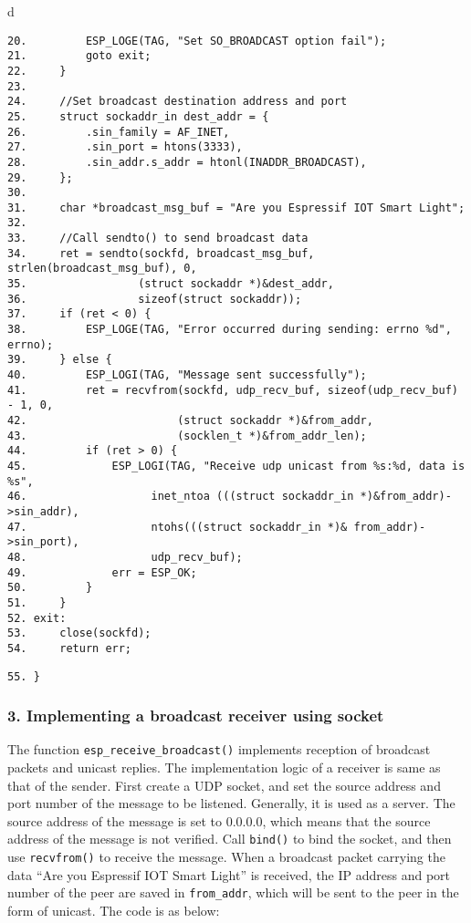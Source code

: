 \documentclass[a4paper,12pt]{book}
\begin{document}
\begin{codebloc}
\begin{tabular}{d}
\vspace{2pt}
\begin{verbatim}
20.         ESP_LOGE(TAG, "Set SO_BROADCAST option fail");
21.         goto exit;
22.     }
23. 	
24.     //Set broadcast destination address and port
25.     struct sockaddr_in dest_addr = {
26.         .sin_family = AF_INET,
27.         .sin_port = htons(3333),
28.         .sin_addr.s_addr = htonl(INADDR_BROADCAST),
29.     };
30.	
31.     char *broadcast_msg_buf = "Are you Espressif IOT Smart Light";
32.	
33.     //Call sendto() to send broadcast data
34.     ret = sendto(sockfd, broadcast_msg_buf, strlen(broadcast_msg_buf), 0,
35.                 (struct sockaddr *)&dest_addr,
36.                 sizeof(struct sockaddr));
37.     if (ret < 0) {
38.         ESP_LOGE(TAG, "Error occurred during sending: errno %d", errno);
39.     } else {
40.         ESP_LOGI(TAG, "Message sent successfully");
41.         ret = recvfrom(sockfd, udp_recv_buf, sizeof(udp_recv_buf) - 1, 0,
42.                       (struct sockaddr *)&from_addr,
43.                       (socklen_t *)&from_addr_len);
44.         if (ret > 0) {
45.             ESP_LOGI(TAG, "Receive udp unicast from %s:%d, data is %s",
46.                   inet_ntoa (((struct sockaddr_in *)&from_addr)->sin_addr),
47.                   ntohs(((struct sockaddr_in *)& from_addr)->sin_port),
48.                   udp_recv_buf);
49.             err = ESP_OK;
50.         }
51.     }
52. exit:
53.     close(sockfd);
54.     return err;
\end{verbatim}
\verb|55. }|
\end{tabular}
\end{codebloc}

\subsubsection{3. Implementing a broadcast receiver using socket}

The function \verb|esp_receive_broadcast()| implements reception of broadcast packets and unicast replies. The implementation logic of a receiver is same as that of the sender. First create a UDP socket, and set the source address and port number of the message to be listened. Generally, it is used as a server. The source address of the message is set to 0.0.0.0, which means that the source address of the message is not verified. Call \verb|bind()| to bind the socket, and then use \verb|recvfrom()| to receive the message. When a broadcast packet carrying the data “Are you Espressif IOT Smart Light” is received, the IP address and port number of the peer are saved in \verb|from_addr|, which will be sent to the peer in the form of unicast. The code is as below:
\end{document}
